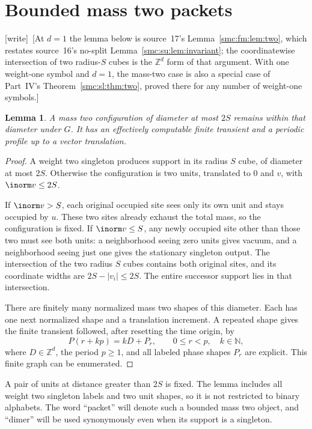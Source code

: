 \documentclass[11pt,letterpaper]{article}
\numberwithin{equation}{section}
\newtheorem{lemma}[theorem]{Lemma}
\theoremstyle{definition}
\theoremstyle{remark}
\newcommand{\Z}{\mathbb Z}
\newcommand{\NN}{\mathbb N}
\newcommand{\wtag}{\textup{[write]}}
\begin{document}
\section{Bounded mass two packets}\label{smc:zd:sec:dimer}
\wtag\ [At $d=1$ the lemma below is source~17's Lemma~\ref{smc:fm:lem:two}, which restates source~16's no-split Lemma~\ref{smc:su:lem:invariant}; the coordinatewise intersection of two radius-$S$ cubes is the $\Z^d$ form of that argument. With one weight-one symbol and $d=1$, the mass-two case is also a special case of Part~IV's Theorem~\ref{smc:sl:thm:two}, proved there for any number of weight-one symbols.]
\begin{lemma}\label{smc:zd:lem:dimer}
A mass two configuration of diameter at most $2S$ remains within that diameter under $G$. It has an effectively computable finite transient and a periodic profile up to a vector translation.
\end{lemma}
\begin{proof}
A weight two singleton produces support in its radius $S$ cube, of diameter at most $2S$. Otherwise the configuration is two units, translated to $0$ and $v$, with $\inorm v\le2S$.

If $\inorm v>S$, each original occupied site sees only its own unit and stays occupied by $u$. These two sites already exhaust the total mass, so the configuration is fixed. If $\inorm v\le S$, any newly occupied site other than those two must see both units: a neighborhood seeing zero units gives vacuum, and a neighborhood seeing just one gives the stationary singleton output. The intersection of the two radius $S$ cubes contains both original sites, and its coordinate widths are $2S-|v_i|\le2S$. The entire successor support lies in that intersection.

There are finitely many normalized mass two shapes of this diameter. Each has one next normalized shape and a translation increment. A repeated shape gives the finite transient followed, after resetting the time origin, by
\begin{equation}\label{smc:zd:eq:packet}
 P(r+kp)=kD+P_r,\qquad 0\le r<p,\quad k\in\NN,
\end{equation}
where $D\in\Z^d$, the period $p\ge1$, and all labeled phase shapes $P_r$ are explicit. This finite graph can be enumerated.
\end{proof}

A pair of units at distance greater than $2S$ is fixed. The lemma includes all weight two singleton labels and two unit shapes, so it is not restricted to binary alphabets. The word ``packet'' will denote such a bounded mass two object, and ``dimer'' will be used synonymously even when its support is a singleton.
\end{document}
